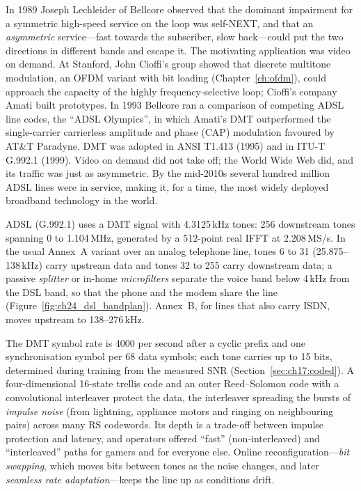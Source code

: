\begin{history}
In 1989 Joseph Lechleider of Bellcore observed that the dominant impairment for a symmetric
high-speed service on the loop was self-NEXT, and that an \emph{asymmetric} service---fast towards
the subscriber, slow back---could put the two directions in different bands and escape it. The
motivating application was video on demand. At Stanford, John Cioffi's group showed that discrete
multitone modulation, an OFDM variant with bit loading (Chapter~\ref{ch:ofdm}), could approach the
capacity of the highly frequency-selective loop; Cioffi's company Amati built prototypes. In 1993
Bellcore ran a comparison of competing ADSL line codes, the ``ADSL Olympics'', in which Amati's DMT
outperformed the single-carrier carrierless amplitude and phase (CAP) modulation favoured by AT\&T
Paradyne. DMT was adopted in ANSI T1.413 (1995) and in ITU-T G.992.1 (1999). Video on demand did not
take off; the World Wide Web did, and its traffic was just as asymmetric. By the mid-2010s several
hundred million ADSL lines were in service, making it, for a time, the most widely deployed
broadband technology in the world.
\end{history}

ADSL (G.992.1) uses a DMT signal with 4.3125\,kHz tones: 256 downstream tones spanning 0 to
1.104\,MHz, generated by a 512-point real IFFT at 2.208\,MS/s. In the usual Annex~A variant over an
analog telephone line, tones 6 to 31 (25.875--138\,kHz) carry upstream data and tones 32 to 255
carry downstream data; a passive \emph{splitter} or in-home \emph{microfilters} separate the voice
band below 4\,kHz from the DSL band, so that the phone and the modem share the line
(Figure~\ref{fig:ch24_dsl_bandplan}). Annex~B, for lines that also carry ISDN, moves upstream to
138--276\,kHz.


The DMT symbol rate is 4000 per second after a cyclic prefix and one synchronisation symbol per 68
data symbols; each tone carries up to 15 bits, determined during training from the measured SNR
(Section~\ref{sec:ch17:coded}). A four-dimensional 16-state trellis code and an outer Reed--Solomon
code with a convolutional interleaver protect the data, the interleaver spreading the bursts of
\emph{impulse noise} (from lightning, appliance motors and ringing on neighbouring pairs) across
many RS codewords. Its depth is a trade-off between impulse protection and latency, and operators
offered ``fast'' (non-interleaved) and ``interleaved'' paths for gamers and for everyone else.
Online reconfiguration---\emph{bit swapping}, which moves bits between tones as the noise changes,
and later \emph{seamless rate adaptation}---keeps the line up as conditions drift.


